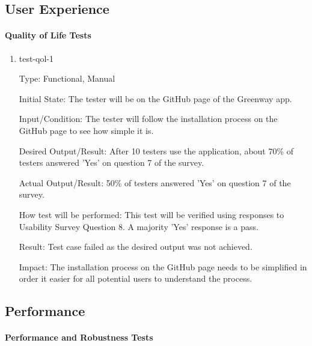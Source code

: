\documentclass[12pt, titlepage]{article}
\begin{document}
\subsection{User Experience}

\paragraph{Quality of Life Tests}

\begin{enumerate}

\item{test-qol-1\\}

Type: Functional, Manual
					
Initial State: The tester will be on the GitHub page of the Greenway app.
					
Input/Condition: The tester will follow the installation process on the GitHub page to see how simple it is.
					
Desired Output/Result: After 10 testers use the application, about 70\% of testers answered 'Yes' on question 7 of the survey.

Actual Output/Result: 50\% of testers answered 'Yes' on question 7 of the survey.
					
How test will be performed: This test will be verified using responses to Usability Survey Question 8. A majority 'Yes' response is a pass.

Result: Test case failed as the desired output was not achieved.

Impact: The installation process on the GitHub page needs to be simplified in order it easier for all potential users to understand the process.

\end{enumerate}

\subsection{Performance}

\paragraph{Performance and Robustness Tests}
\end{document}

